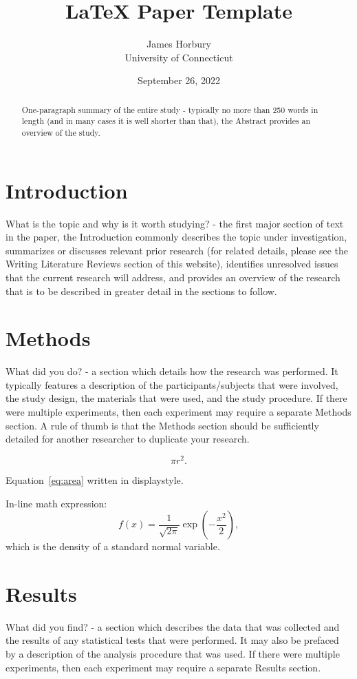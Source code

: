 \documentclass[12pt]{article}
\title{LaTeX Paper Template}
\author{James Horbury\\
    University of Connecticut
}
\date{September 26, 2022}
\begin{document}
\maketitle

\begin{abstract}
One-paragraph summary of the entire study - typically no more than 250 words in length (and in many cases it is well shorter than that), the Abstract provides an overview of the study.
\end{abstract}

\section*{Introduction}
What is the topic and why is it worth studying? - the first major section of text in the paper, the Introduction commonly describes the topic under investigation, summarizes or discusses relevant prior research (for related details, please see the Writing Literature Reviews section of this website), identifies unresolved issues that the current research will address, and provides an overview of the research that is to be described in greater detail in the sections to follow.

\section*{Methods}
What did you do? - a section which details how the research was performed.  It typically features a description of the participants/subjects that were involved, the study design, the materials that were used, and the study procedure.  If there were multiple experiments, then each experiment may require a separate Methods section.  A rule of thumb is that the Methods section should be sufficiently detailed for another researcher to duplicate your research.

\begin{equation}
    \label{eq:area}
    \pi r^2.
\end{equation}

Equation~\eqref{eq:area} written in displaystyle.

In-line math expression:
\[
  f(x) = \frac{1}{\sqrt{2\pi}} \exp\left( - \frac{x^2}{2} \right),
\]
which is the density of a standard normal variable.

\section*{Results}
What did you find? - a section which describes the data that was collected and the results of any statistical tests that were performed.  It may also be prefaced by a description of the analysis procedure that was used. If there were multiple experiments, then each experiment may require a separate Results section.
\end{document}
